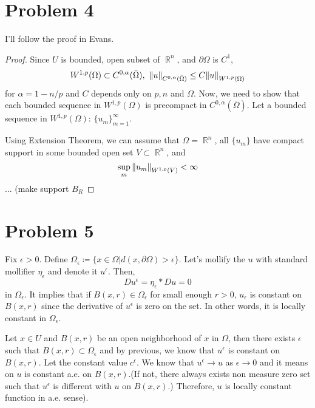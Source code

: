 \documentclass{article}
\DeclareMathOperator{\rr}{\mathbb{R}}
\begin{document}
\section*{Problem 4}
I'll follow the proof in Evans.
\begin{proof}
Since $U$ is bounded, open subset of $\rr^n$, and $\partial \Omega$ is $C^1$,
\begin{equation*}
W^{1,p}(\Omega)\subset C^{0, \alpha}(\bar{\Omega}),~\norm{u}_{C^{0, \alpha}(\bar{\Omega})}\leq C\norm{u}_{W^{1,p}(\Omega)}
\end{equation*}
for $\alpha=1-n/p$ and $C$ depends only on $p,n$ and $\Omega$. Now, we need to show that each bounded sequence in $W^{1,p}(\Omega)$ is precompact in $C^{0, \alpha}(\bar{\Omega})$. Let a bounded sequence in $W^{1,p}(\Omega)$: $\{u_m\}_{m=1}^\infty$.

Using Extension Theorem, we can assume that $\Omega=\rr^n$, all $\{u_m\}$ have compact support in some bounded open set $V\subset \rr^n$, and
\begin{equation*}
\sup\limits_m \norm{u_m}_{W^{1,p}(V)}<\infty
\end{equation*}
... (make support $B_R$
\end{proof}
\section*{Problem 5}
Fix $\epsilon>0$. Define $\Omega_\epsilon\coloneqq\{x\in \Omega|d(x,\partial \Omega)>\epsilon\}$. Let's mollify the $u$ with standard mollifier $\eta_\epsilon$ and denote it $u^\epsilon$. Then,
\begin{equation*}
Du^\epsilon=\eta_\epsilon*Du=0
\end{equation*}
in $\Omega_\epsilon$. It implies that if $B(x, r)\in \Omega_\epsilon$ for small enough $r>0$, $u_\epsilon$ is constant on $B(x,r)$ since the derivative of $u^\epsilon$ is zero on the set. In other words, it is locally constant in $\Omega_\epsilon$.

Let $x\in U$ and $B(x, r)$ be an open neighborhood of $x$ in $\Omega$, then there exists $\epsilon$ such that $B(x, r)\subset \Omega_\epsilon$ and by previous, we know that $u^\epsilon$ is constant on $B(x,r)$. Let the constant value $c^\epsilon$. We know that $u^\epsilon\rightarrow u$ as $\epsilon\rightarrow 0$ and it means on $u$ is constant a.e. on $B(x,r)$.(If not, there always exists non measure zero set such that $u^\epsilon$ is different with $u$ on $B(x,r)$.) Therefore, $u$ is locally constant function in a.e. sense).
\end{document}
